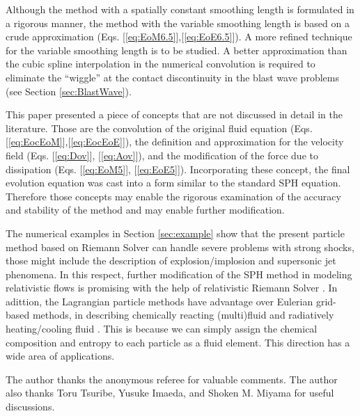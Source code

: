 \documentclass{cjour}
\begin{document}
\begin{article}
Although the method with a spatially constant smoothing length is 
formulated in a rigorous manner, 
the method with the variable smoothing length is based on 
a crude approximation 
(Eqs. [\ref{eq:EoM6.5}],[\ref{eq:EoE6.5}]).  
A more refined technique for the variable smoothing length 
is to be studied. 
A better approximation than the cubic spline interpolation 
in the numerical convolution is required to eliminate 
the ``wiggle'' at the contact discontinuity in the blast wave 
problems (see Section \ref{sec:BlastWave}). 


This paper presented a piece of concepts 
that are not discussed in detail in the literature. 
Those are 
the convolution of the original fluid equation 
(Eqs. [\ref{eq:EocEoM}],[\ref{eq:EocEoE}]), 
the definition and approximation for the velocity field 
(Eqs. [\ref{eq:Dov}], [\ref{eq:Aov}]), 
and the modification of the force due to dissipation 
(Eqs. [\ref{eq:EoM5}], [\ref{eq:EoE5}]). 
Incorporating these concept, 
the final evolution equation was cast into 
a form similar to the standard SPH equation. 
Therefore those concepts may enable the rigorous examination 
of the accuracy and stability of the method and 
may enable further modification.  

The numerical examples in Section \ref{sec:example} show 
that the present particle method based on Riemann Solver 
can handle severe problems with strong shocks, 
those might include the description of explosion/implosion
and supersonic jet phenomena.   
In this respect, further modification of the SPH method 
in modeling relativistic flows is promising with 
the help of relativistic Riemann Solver 
\cite{MartiMuller:1996}. 
In adittion, 
the Lagrangian particle methods have advantage over Eulerian 
grid-based methods, in describing chemically reacting 
(multi)fluid and radiatively heating/cooling fluid 
\cite{SI:NAP}. 
This is because we can simply assign 
the chemical composition and entropy to each particle 
as a fluid element.   
This direction has a wide area of applications. 



\begin{acknowledgment}
The author thanks the anonymous referee for valuable comments. 
The author also thanks Toru Tsuribe, Yusuke Imaeda, and 
Shoken M. Miyama for useful discussions.  
\end{acknowledgment}




\end{article}
\end{document}

